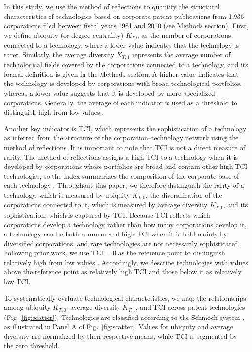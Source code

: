 \documentclass[lineno,pdflatex,sn-mathphys-num]{sn-jnl}%
\theoremstyle{thmstyleone}%
\theoremstyle{thmstyletwo}%
\theoremstyle{thmstylethree}%
\begin{document}
In this study, we use the method of reflections to quantify the structural characteristics of technologies based on corporate patent publications from 1,936 corporations filed between fiscal years 1981 and 2010 (see Methods section).
First, we define ubiquity (or degree centrality) $K_{T,0}$ as the number of corporations connected to a technology, where a lower value indicates that the technology is rarer.
Similarly, the average diversity $K_{T,1}$ represents the average number of technological fields covered by the corporations connected to a technology, and its formal definition is given in the Methods section.
A higher value indicates that the technology is developed by corporations with broad technological portfolios, whereas a lower value suggests that it is developed by more specialized corporations.
Generally, the average of each indicator is used as a threshold to distinguish high from low values \cite{hidalgo2009eci,balland2017tci, Balland2018}.

Another key indicator is TCI, which represents the sophistication of a technology as inferred from the structure of the corporation--technology network using the method of reflections.
It is important to note that TCI is not a direct measure of rarity.
The method of reflections assigns a high TCI to a technology when it is developed by corporations whose portfolios are broad and contain other high TCI technologies, so the index summarizes the composition of the corporate base of each technology \cite{hidalgo2009eci,Mealy2019}.
Throughout this paper, we therefore distinguish the rarity of a technology, which is measured by ubiquity $K_{T,0}$, the diversification of the corporations connected to it, which is measured by average diversity $K_{T,1}$, and its sophistication, which is captured by TCI.
Because TCI reflects which corporations develop a technology rather than how many corporations develop it, a technology can be both common and high TCI when it is held mainly by diversified corporations, and rare technologies are not necessarily sophisticated.
Following prior work, we use \(\text{TCI}=0\) as the reference point to distinguish relatively high from low values \cite{balland2017tci}.
Accordingly, we describe technologies with values above the reference point as relatively high TCI and those below it as relatively low TCI.

To systematically evaluate technological characteristics, we map the relationships among ubiquity $K_{T,0}$, average diversity $K_{T,1}$, and TCI across patent technologies (Fig.~\ref{fig:scatter}).
Technologies are classified according to the Schmoch system \cite{Schmoch2008}, as illustrated in Panel A of Fig.~\ref{fig:scatter}. Values for ubiquity and average diversity are normalized by their respective means, while TCI is segmented by the zero threshold.
\end{document}

